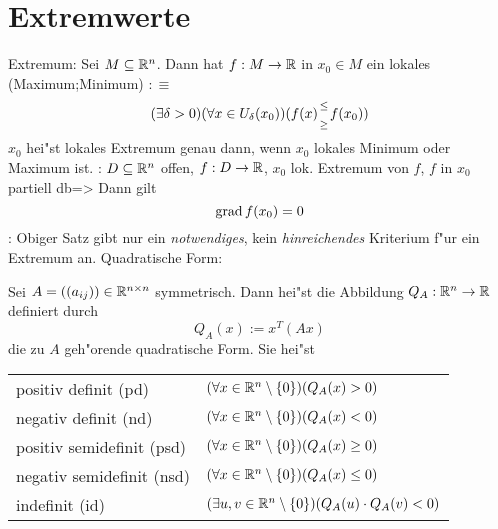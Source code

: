 \section{Extremwerte}
 Extremum:{
  Sei $M\subseteq\mathbb R^n$. Dann hat $f:M\to\mathbb R$ in $x_0\in M$ ein lokales
  \tstack(Maximum;Minimum) $:\equiv$
  \[(\exists\delta>0)(\forall x\in U_\delta(x_0))(f(x)\stack(\leq;\geq)f(x_0))
    \]
  $x_0$ hei"st lokales Extremum genau dann, wenn $x_0$ lokales Minimum oder
  Maximum ist.
}
\theorem:
  $D\subseteq\mathbb R^n$ offen, $f:D\to\mathbb R$, $x_0$ lok. Extremum von
  $f$, $f$ in $x_0$ partiell db=>{
  Dann gilt
  \[\operatorname{grad} f(x_0)=0
    \]
  }
\remark:{
  Obiger Satz gibt nur ein \textit{notwendiges}, kein \textit{hinreichendes}
  Kriterium f"ur ein Extremum an.
  }
 Quadratische Form:{
  Sei $A=((a_{ij}))\in\mathbb R^{n\times n}$ symmetrisch.
  Dann hei"st die Abbildung $Q_A:\mathbb R^n\to\mathbb R$ definiert durch
  \[Q_A(x):=x^T(Ax)
    \]
  die zu $A$ geh"orende quadratische Form. 
  Sie hei"st
  
  \begin{tabular}{l@{$:\equiv$}l}
    positiv definit (pd) & $(\forall x\in\mathbb R^n\setminus\{0\})(Q_A(x)>0)$ \\
    negativ definit (nd) & $(\forall x\in\mathbb R^n\setminus\{0\})(Q_A(x)<0)$ \\
    positiv semidefinit (psd) & $(\forall x\in\mathbb R^n\setminus\{0\})(Q_A(x)\geq 0)$ \\
    negativ semidefinit (nsd) & $(\forall x\in\mathbb R^n\setminus\{0\})(Q_A(x)\leq 0)$ \\
    indefinit (id) & $(\exists u,v\in\mathbb R^n\setminus\{0\})(Q_A(u)\cdot Q_A(v)<0)$ \\
    \end{tabular}
  }
